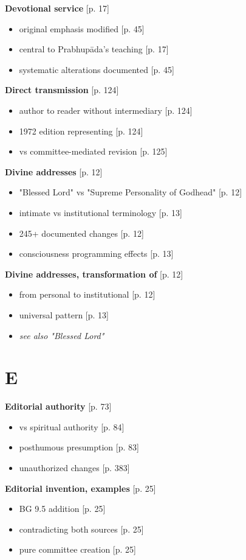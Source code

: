 \documentclass[11pt,twoside]{book}
\begin{document}
\textbf{\textbf{Devotional service}} {[}p. 17]
\begin{itemize}
\item original emphasis modified [p. 45]
\item central to Prabhupāda's teaching [p. 17]
\item systematic alterations documented [p. 45]
\end{itemize}

\textbf{\textbf{Direct transmission}} {[}p. 124]
\begin{itemize}
\item author to reader without intermediary [p. 124]
\item 1972 edition representing [p. 124]
\item vs committee-mediated revision [p. 125]
\end{itemize}

\textbf{\textbf{Divine addresses}} {[}p. 12]
\begin{itemize}
\item "Blessed Lord" vs "Supreme Personality of Godhead" [p. 12]
\item intimate vs institutional terminology [p. 13]
\item 245+ documented changes [p. 12]
\item consciousness programming effects [p. 13]
\end{itemize}

\textbf{\textbf{Divine addresses, transformation of}} {[}p. 12]
\begin{itemize}
\item from personal to institutional [p. 12]
\item universal pattern [p. 13]
\item \emph{see also "Blessed Lord"}
\end{itemize}
\section*{E}
\label{sec:org31e2ef9}

\textbf{\textbf{Editorial authority}} {[}p. 73]
\begin{itemize}
\item vs spiritual authority [p. 84]
\item posthumous presumption [p. 83]
\item unauthorized changes [p. 383]
\end{itemize}

\textbf{\textbf{Editorial invention, examples}} {[}p. 25]
\begin{itemize}
\item BG 9.5 addition [p. 25]
\item contradicting both sources [p. 25]
\item pure committee creation [p. 25]
\end{itemize}
\end{document}
